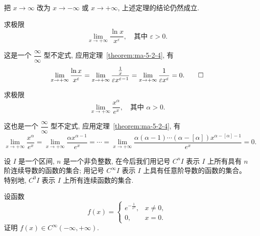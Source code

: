 \begin{remark}\label{remark:ma-5-source-48}
把 $x\to\infty$ 改为 $x\to-\infty$ 或 $x\to+\infty$, 上述定理的结论仍然成立.
\end{remark}


\begin{example}\label{example:ma-5-2-4}
求极限
\[
  \lim_{x\to+\infty}\frac{\ln x}{x^\varepsilon},\quad \text{其中 }\varepsilon>0.
\]
\end{example}


\begin{solve}
这是一个 $\dfrac\infty\infty$ 型不定式, 应用定理~\ref{theorem:ma-5-2-4}, 有
\[
  \lim_{x\to+\infty}\frac{\ln x}{x^\varepsilon}
  =
  \lim_{x\to+\infty}\frac{\frac1x}{\varepsilon x^{\varepsilon-1}}
  =
  \lim_{x\to+\infty}\frac1{\varepsilon x^\varepsilon}=0.
\qedhere
\]
\end{solve}


\begin{example}\label{example:ma-5-2-5}
求极限
\[
  \lim_{x\to+\infty}\frac{x^\alpha}{e^x},\quad \text{其中 }\alpha>0.
\]
\end{example}


\begin{solve}
这也是一个 $\dfrac\infty\infty$ 型不定式, 应用定理~\ref{theorem:ma-5-2-4}, 有
\[
  \lim_{x\to+\infty}\frac{x^\alpha}{e^x}
  =
  \lim_{x\to+\infty}\frac{\alpha x^{\alpha-1}}{e^x}
  =
  \cdots
  =
  \lim_{x\to+\infty}
  \frac{\alpha(\alpha-1)\cdots(\alpha-[\alpha])x^{\alpha-[\alpha]-1}}{e^x}
  =
  0.
\]

设 $I$ 是一个区间, $n$ 是一个非负整数, 在今后我们用记号 $C^nI$ 表示 $I$ 上所有具有 $n$ 阶连续导数的函数的集合; 用记号 $C^\infty I$ 表示 $I$ 上具有任意阶导数的函数的集合。特别地, $C^0I$ 表示 $I$ 上所有连续函数的集合.
\end{solve}


\begin{example}\label{example:ma-5-2-6}
设函数
\[
  f(x)=
  \begin{cases}
    e^{-\frac1{x^2}}, & x\ne0,\\
    0, & x=0.
  \end{cases}
\]
证明 $f(x)\in C^\infty(-\infty,+\infty)$.
\end{example}


